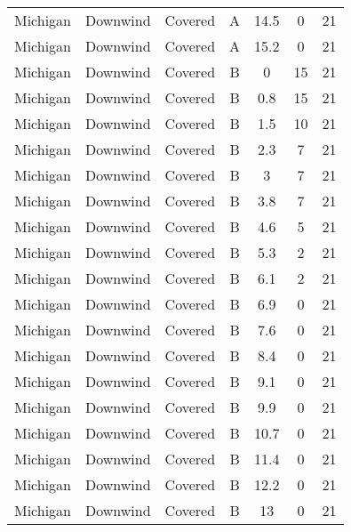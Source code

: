 \documentclass{article}
\begin{document}
\begin{longtable}[c]{ccccccc}
Michigan  & Downwind  & Covered     & A               & 14.5         & 0           & 21  \\
Michigan  & Downwind  & Covered     & A               & 15.2         & 0           & 21  \\
Michigan  & Downwind  & Covered     & B               & 0            & 15          & 21  \\
Michigan  & Downwind  & Covered     & B               & 0.8          & 15          & 21  \\
Michigan  & Downwind  & Covered     & B               & 1.5          & 10          & 21  \\
Michigan  & Downwind  & Covered     & B               & 2.3          & 7           & 21  \\
Michigan  & Downwind  & Covered     & B               & 3            & 7           & 21  \\
Michigan  & Downwind  & Covered     & B               & 3.8          & 7           & 21  \\
Michigan  & Downwind  & Covered     & B               & 4.6          & 5           & 21  \\
Michigan  & Downwind  & Covered     & B               & 5.3          & 2           & 21  \\
Michigan  & Downwind  & Covered     & B               & 6.1          & 2           & 21  \\
Michigan  & Downwind  & Covered     & B               & 6.9          & 0           & 21  \\
Michigan  & Downwind  & Covered     & B               & 7.6          & 0           & 21  \\
Michigan  & Downwind  & Covered     & B               & 8.4          & 0           & 21  \\
Michigan  & Downwind  & Covered     & B               & 9.1          & 0           & 21  \\
Michigan  & Downwind  & Covered     & B               & 9.9          & 0           & 21  \\
Michigan  & Downwind  & Covered     & B               & 10.7         & 0           & 21  \\
Michigan  & Downwind  & Covered     & B               & 11.4         & 0           & 21  \\
Michigan  & Downwind  & Covered     & B               & 12.2         & 0           & 21  \\
Michigan  & Downwind  & Covered     & B               & 13           & 0           & 21  \\

\end{longtable}
\end{document}
